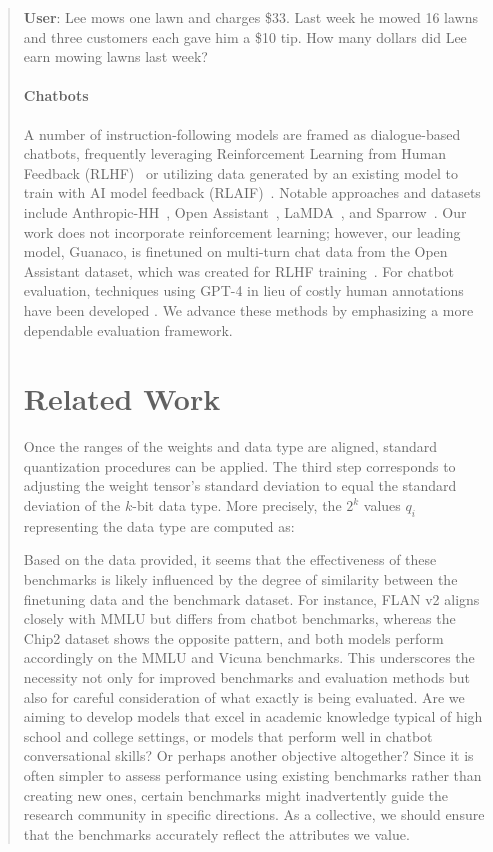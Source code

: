 \begin{quote}
    \textbf{User}: Lee mows one lawn and charges \$33. Last week he mowed 16 lawns and three customers each gave him a \$10 tip. How many dollars did Lee earn mowing lawns last week?

\paragraph{Chatbots} A number of instruction-following models are framed as dialogue-based chatbots, frequently leveraging Reinforcement Learning from Human Feedback (RLHF)~\citep{christiano2017deep} or utilizing data generated by an existing model to train with AI model feedback (RLAIF)~\citep{bai2022constitutional}. Notable approaches and datasets include Anthropic-HH~\citep{askell2021general,bai2022training}, Open Assistant~\citep{kopf2023openassistant}, LaMDA~\citep{thoppilan2022lamda}, and Sparrow~\citep{glaese2022improving}. Our work does not incorporate reinforcement learning; however, our leading model, Guanaco, is finetuned on multi-turn chat data from the Open Assistant dataset, which was created for RLHF training~\citep{kopf2023openassistant}. For chatbot evaluation, techniques using GPT-4 in lieu of costly human annotations have been developed \citep{vicuna2023,peng2023instruction}. We advance these methods by emphasizing a more dependable evaluation framework.

\section{Related Work}

Once the ranges of the weights and data type are aligned, standard quantization procedures can be applied. The third step corresponds to adjusting the weight tensor's standard deviation to equal the standard deviation of the $k$-bit data type. More precisely, the $2^k$ values $q_i$ representing the data type are computed as:

Based on the data provided, it seems that the effectiveness of these benchmarks is likely influenced by the degree of similarity between the finetuning data and the benchmark dataset. For instance, FLAN v2 aligns closely with MMLU but differs from chatbot benchmarks, whereas the Chip2 dataset shows the opposite pattern, and both models perform accordingly on the MMLU and Vicuna benchmarks. This underscores the necessity not only for improved benchmarks and evaluation methods but also for careful consideration of what exactly is being evaluated. Are we aiming to develop models that excel in academic knowledge typical of high school and college settings, or models that perform well in chatbot conversational skills? Or perhaps another objective altogether? Since it is often simpler to assess performance using existing benchmarks rather than creating new ones, certain benchmarks might inadvertently guide the research community in specific directions. As a collective, we should ensure that the benchmarks accurately reflect the attributes we value.


\end{quote}

